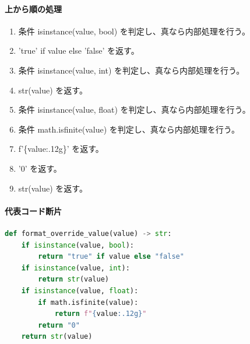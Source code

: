 \documentclass[a4paper,11pt]{article}
\begin{document}
            \paragraph{上から順の処理}
            \begin{enumerate}[leftmargin=1.8em]
            \item 条件 isinstance(value, bool) を判定し、真なら内部処理を行う。
\item   'true' if value else 'false' を返す。
\item 条件 isinstance(value, int) を判定し、真なら内部処理を行う。
\item   str(value) を返す。
\item 条件 isinstance(value, float) を判定し、真なら内部処理を行う。
\item   条件 math.isfinite(value) を判定し、真なら内部処理を行う。
\item     f'\{value:.12g\}' を返す。
\item   '0' を返す。
\item str(value) を返す。
            \end{enumerate}
            \paragraph{代表コード断片}
            \begin{lstlisting}[language=Python]
def format_override_value(value) -> str:
    if isinstance(value, bool):
        return "true" if value else "false"
    if isinstance(value, int):
        return str(value)
    if isinstance(value, float):
        if math.isfinite(value):
            return f"{value:.12g}"
        return "0"
    return str(value)
\end{lstlisting}
\end{document}

